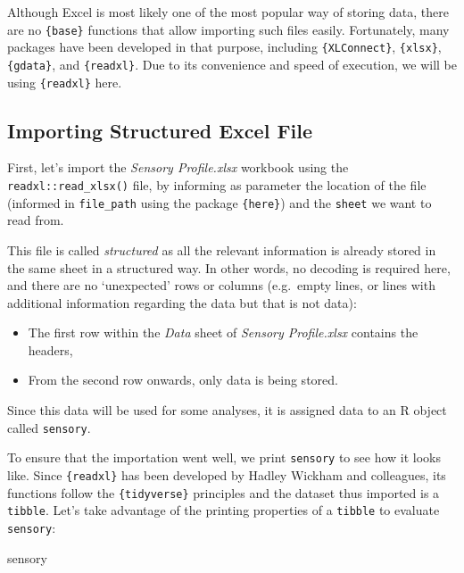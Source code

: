 \documentclass[
]{book}
\newenvironment{Shaded}{\begin{snugshade}}{\end{snugshade}}
\newcommand{\NormalTok}[1]{#1}
\providecommand{\tightlist}{%
  \setlength{\itemsep}{0pt}\setlength{\parskip}{0pt}}
\begin{document}
Although Excel is most likely one of the most popular way of storing data, there are no \texttt{\{base\}} functions that allow importing such files easily. Fortunately, many packages have been developed in that purpose, including \texttt{\{XLConnect\}}, \texttt{\{xlsx\}}, \texttt{\{gdata\}}, and \texttt{\{readxl\}}. Due to its convenience and speed of execution, we will be using \texttt{\{readxl\}} here.

\hypertarget{importing-structured-excel-file}{%
\subsection{Importing Structured Excel File}\label{importing-structured-excel-file}}

First, let's import the \emph{Sensory Profile.xlsx} workbook using the \texttt{readxl::read\_xlsx()} file, by informing as parameter the location of the file (informed in \texttt{file\_path} using the package \texttt{\{here\}}) and the \texttt{sheet} we want to read from.

This file is called \emph{structured} as all the relevant information is already stored in the same sheet in a structured way. In other words, no decoding is required here, and there are no `unexpected' rows or columns (e.g.~empty lines, or lines with additional information regarding the data but that is not data):

\begin{itemize}
\tightlist
\item
  The first row within the \emph{Data} sheet of \emph{Sensory Profile.xlsx} contains the headers,\\
\item
  From the second row onwards, only data is being stored.
\end{itemize}

Since this data will be used for some analyses, it is assigned data to an R object called \texttt{sensory}.

To ensure that the importation went well, we print \texttt{sensory} to see how it looks like. Since \texttt{\{readxl\}} has been developed by Hadley Wickham and colleagues, its functions follow the \texttt{\{tidyverse\}} principles and the dataset thus imported is a \texttt{tibble}. Let's take advantage of the printing properties of a \texttt{tibble} to evaluate \texttt{sensory}:

\begin{Shaded}
\begin{Highlighting}[]
\NormalTok{sensory}
\end{Highlighting}
\end{Shaded}
\end{document}
